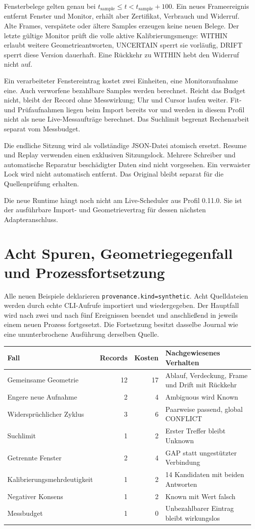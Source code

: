 \documentclass[11pt,a4paper]{article}
\newcommand{\nextsection}[2]{\clearpage{\color{accent}\small\textsf{#1}}\section{#2}}
\begin{document}
Fensterbelege gelten genau bei
$t_{\mathrm{sample}}\le t<t_{\mathrm{sample}}+100$.
Ein neues Frameereignis entfernt Fenster und Monitor, erhält aber
Zertifikat, Verbrauch und Widerruf. Alte Frames, verspätete oder
ältere Samples erzeugen keine neuen Belege. Der letzte gültige
Monitor prüft die volle aktive Kalibrierungsmenge: WITHIN erlaubt
weitere Geometrieantworten, UNCERTAIN sperrt sie vorläufig,
DRIFT sperrt diese Version dauerhaft. Eine Rückkehr zu WITHIN
hebt den Widerruf nicht auf.

Ein verarbeiteter Fenstereintrag kostet zwei Einheiten, eine
Monitoraufnahme eine. Auch verworfene bezahlbare Samples werden
berechnet. Reicht das Budget nicht, bleibt der Record ohne
Messwirkung; Uhr und Cursor laufen weiter. Fit- und Prüfaufnahmen
liegen beim Import bereits vor und werden in diesem Profil nicht
als neue Live-Messaufträge berechnet. Das Suchlimit begrenzt
Rechenarbeit separat vom Messbudget.

Die endliche Sitzung wird als vollständige JSON-Datei atomisch
ersetzt. Resume und Replay verwenden einen exklusiven Sitzungslock.
Mehrere Schreiber und automatische Reparatur beschädigter Daten
sind nicht vorgesehen. Ein verwaister Lock wird nicht automatisch
entfernt. Das Original bleibt separat für die Quellenprüfung erhalten.

Die neue Runtime hängt noch nicht am Live-Scheduler aus Profil
0.11.0. Sie ist der ausführbare Import- und Geometrievertrag für
dessen nächsten Adapteranschluss.

\nextsection{70 / AUSGEFÜHRTE NACHWEISE}{Acht Spuren, Geometriegegenfall und Prozessfortsetzung}
Alle neuen Beispiele deklarieren \texttt{provenance.kind=synthetic}.
Acht Quelldateien werden durch echte CLI-Aufrufe importiert und
wiedergegeben. Der Hauptfall wird nach zwei und nach fünf
Ereignissen beendet und anschließend in jeweils einem neuen
Prozess fortgesetzt. Die Fortsetzung besitzt dasselbe Journal wie
eine ununterbrochene Ausführung derselben Quelle.

\begin{tabularx}{\linewidth}{@{}YrrY@{}}\toprule
Fall & Records & Kosten & Nachgewiesenes Verhalten\\\midrule
Gemeinsame Geometrie & 12 & 17 & Ablauf, Verdeckung, Frame und Drift mit Rückkehr\\
Engere neue Aufnahme & 2 & 4 & Ambiguous wird Known\\
Widersprüchlicher Zyklus & 3 & 6 & Paarweise passend, global CONFLICT\\
Suchlimit & 1 & 2 & Erster Treffer bleibt Unknown\\
Getrennte Fenster & 2 & 4 & GAP statt ungestützter Verbindung\\
Kalibrierungsmehrdeutigkeit & 1 & 2 & 14 Kandidaten mit beiden Antworten\\
Negativer Konsens & 1 & 2 & Known mit Wert falsch\\
Messbudget & 1 & 0 & Unbezahlbarer Eintrag bleibt wirkungslos\\\bottomrule
\end{tabularx}
\end{document}
